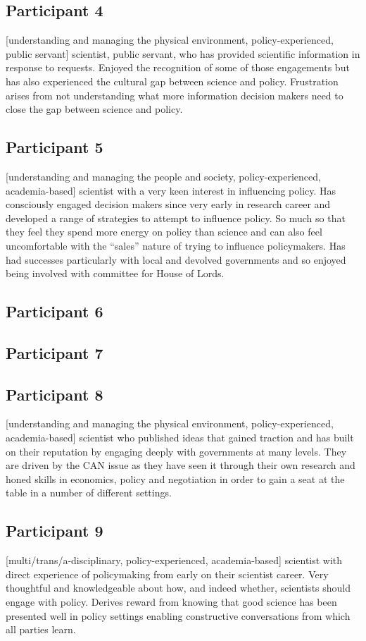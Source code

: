 \subsection{Participant 4}\label{sec:p4}
[understanding and managing the physical environment, policy-experienced, public servant] scientist, public servant, who has provided scientific information in response to requests. Enjoyed the recognition of some of those engagements but has also experienced the cultural gap between science and policy. Frustration arises from not understanding what more information decision makers need to close the gap between science and policy.

\subsection{Participant 5}\label{sec:p5}
[understanding and managing the people and society, policy-experienced, academia-based] scientist with a very keen interest in influencing policy. Has consciously engaged decision makers since very early in research career and developed a range of strategies to attempt to influence policy. So much so that they feel they spend more energy on policy than science and can also feel uncomfortable with the ``sales'' nature of trying to influence policymakers. Has had successes particularly with local and devolved governments and so enjoyed being involved with committee for House of Lords.

\subsection{Participant 6}\label{sec:p6}
\subsection{Participant 7}\label{sec:p7}
\subsection{Participant 8}\label{sec:p8}
[understanding and managing the physical environment, policy-experienced, academia-based] scientist who published ideas that gained traction and has built on their reputation by engaging deeply with governments at many levels. They are driven by the  CAN issue as they have seen it through their own research and honed skills in economics, policy and negotiation in order to gain a seat at the table in a number of different settings.

\subsection{Participant 9}\label{sec:p9}
[multi/trans/a-disciplinary, policy-experienced, academia-based] scientist with direct experience of policymaking from early on their scientist career. Very thoughtful and knowledgeable about how, and indeed whether, scientists should engage with policy. Derives reward from knowing that good science has been presented well in policy settings enabling constructive conversations from which all parties learn.

